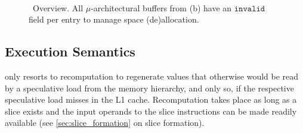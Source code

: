  
 \begin{figure}
     \centering
     ~~~
     \caption{ \arch\ Overview. All $\mu$-architectural buffers from (b) have  
an $\texttt{invalid}$ field per entry to
manage space (de)allocation.}
     \label{fig:overview}
\end{figure}
 
 
 \subsection{Execution Semantics}
 
 \arch{} only resorts to recomputation to regenerate values that otherwise would be read by a speculative load from the memory hierarchy, and only so, if the respective speculative load misses in the L1 cache. Recomputation takes place as long as a slice exists and the input operands to the slice instructions can be made readily available (see \autoref{sec:slice_formation} on slice formation).
 
